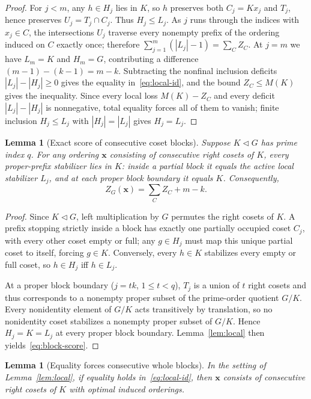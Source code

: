 \documentclass[11pt,reqno]{amsart}
\numberwithin{equation}{section}
\newtheorem{lemma}[theorem]{Lemma}
\theoremstyle{definition}
\theoremstyle{remark}
\begin{document}
\begin{proof}
For $j<m$, any $h\in H_j$ lies in $K$, so $h$ preserves both $C_j=Kx_j$ and $T_j$, hence preserves $U_j=T_j\cap C_j$. Thus $H_j\le L_j$. As $j$ runs through the indices with $x_j\in C$, the intersections $U_j$ traverse every nonempty prefix of the ordering induced on $C$ exactly once; therefore $\sum_{j=1}^{m}(|L_j|-1)=\sum_C Z_C$. At $j=m$ we have $L_m=K$ and $H_m=G$, contributing a difference $(m-1)-(k-1)=m-k$. Subtracting the nonfinal inclusion deficits $|L_j|-|H_j|\ge 0$ gives the equality in~\eqref{eq:local-id}, and the bound $Z_C\le M(K)$ gives the inequality. Since every local loss $M(K)-Z_C$ and every deficit $|L_j|-|H_j|$ is nonnegative, total equality forces all of them to vanish; finite inclusion $H_j\le L_j$ with $|H_j|=|L_j|$ gives $H_j=L_j$.
\end{proof}

\begin{lemma}[Exact score of consecutive coset blocks]
\label{lem:block-score}
Suppose $K\lhd G$ has prime index $q$. For any ordering $\mathbf{x}$ consisting of consecutive right cosets of $K$, every proper-prefix stabilizer lies in $K$: inside a partial block it equals the active local stabilizer $L_j$, and at each proper block boundary it equals $K$. Consequently,
\begin{equation}
\label{eq:block-score}
Z_G(\mathbf{x}) = \sum_C Z_C + m - k.
\end{equation}
\end{lemma}

\begin{proof}
Since $K\lhd G$, left multiplication by $G$ permutes the right cosets of $K$. A prefix stopping strictly inside a block has exactly one partially occupied coset $C_j$, with every other coset empty or full; any $g\in H_j$ must map this unique partial coset to itself, forcing $g\in K$. Conversely, every $h\in K$ stabilizes every empty or full coset, so $h\in H_j$ iff $h\in L_j$.

At a proper block boundary ($j=tk$, $1\le t<q$), $T_j$ is a union of $t$ right cosets and thus corresponds to a nonempty proper subset of the prime-order quotient $G/K$. Every nonidentity element of $G/K$ acts transitively by translation, so no nonidentity coset stabilizes a nonempty proper subset of $G/K$. Hence $H_j=K=L_j$ at every proper block boundary. Lemma~\ref{lem:local} then yields~\eqref{eq:block-score}.
\end{proof}

\begin{lemma}[Equality forces consecutive whole blocks]
\label{lem:force-blocks}
In the setting of Lemma~\ref{lem:local}, if equality holds in~\eqref{eq:local-id}, then $\mathbf{x}$ consists of consecutive right cosets of $K$ with optimal induced orderings.
\end{lemma}
\end{document}
